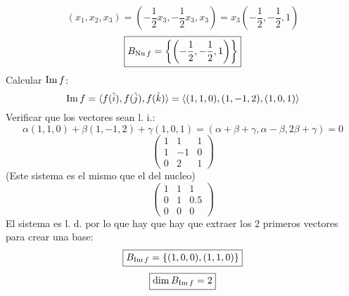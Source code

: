 \documentclass[../practica.root.tex]{subfiles}
\begin{document}
\begin{enumerate}
\begin{enumerate}
\[                    \] \[
                        (x_1, x_2, x_3) = \left( -\frac{1}{2}x_3, -\frac{1}{2}x_3, x_3 \right) = x_3\left(-\frac{1}{2}, -\frac{1}{2}, 1\right)
                    \] \[
                        \boxed{B_{\operatorname{Nu} f} = \left\{\left(-\frac{1}{2}, -\frac{1}{2}, 1\right)\right\}}
                    \]
                    Calcular $\operatorname{Im} f$:
                    \[ \operatorname{Im} f = \langle f(\hat{i}), f(\hat{j}), f(\hat{k}) \rangle = \langle (1,1,0),(1,-1,2),(1,0,1) \rangle\]
                    Verificar que los vectores sean l. i.:
                    \[
                        \alpha(1,1,0) + \beta(1,-1,2) + \gamma(1,0,1) = (\alpha + \beta + \gamma, \alpha - \beta, 2\beta + \gamma) = 0
                    \] \[
                        \begin{pmatrix}
                            1 & 1  & 1 \\
                            1 & -1 & 0 \\
                            0 & 2  & 1
                        \end{pmatrix}
                    \]
                    (Este sistema es el mismo que el del nucleo)
                    \[
                        \begin{pmatrix}
                            1 & 1 & 1   \\
                            0 & 1 & 0.5 \\
                            0 & 0 & 0
                        \end{pmatrix}
                    \]
                    El sistema es l. d. por lo que hay que hay que extraer los 2 primeros vectores para crear una base:
                    \[ \boxed{B_{\operatorname{Im} f} = \{ (1,0,0),(1,1,0) \}} \]
                    \[ \boxed{\dim B_{\operatorname{Im} f} = 2} \]


\end{enumerate}
\end{enumerate}
\end{document}
